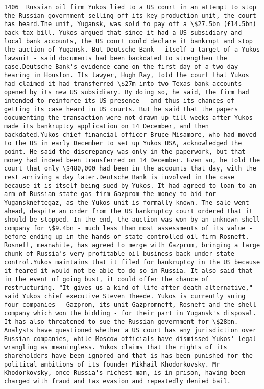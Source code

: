 \documentclass[11pt]{article}
\begin{document}
\begin{Verbatim}[commandchars=\\\{\}]
         1406  Russian oil firm Yukos lied to a US court in an attempt to stop the Russian government selling off its key production unit, the court has heard.The unit, Yugansk, was sold to pay off a \$27.5bn (£14.5bn) back tax bill. Yukos argued that since it had a US subsidiary and local bank accounts, the US court could declare it bankrupt and stop the auction of Yugansk. But Deutsche Bank - itself a target of a Yukos lawsuit - said documents had been backdated to strengthen the case.Deutsche Bank's evidence came on the first day of a two-day hearing in Houston. Its lawyer, Hugh Ray, told the court that Yukos had claimed it had transferred \$27m into two Texas bank accounts opened by its new US subsidiary. By doing so, he said, the firm had intended to reinforce its US presence - and thus its chances of getting its case heard in US courts. But he said that the papers documenting the transaction were not drawn up till weeks after Yukos made its bankruptcy application on 14 December, and then backdated.Yukos chief financial officer Bruce Misamore, who had moved to the US in early December to set up Yukos USA, acknowledged the point. He said the discrepancy was only in the paperwork, but that money had indeed been transferred on 14 December. Even so, he told the court that only \$480,000 had been in the accounts that day, with the rest arriving a day later.Deutsche Bank is involved in the case because it is itself being sued by Yukos. It had agreed to loan to an arm of Russian state gas firm Gazprom the money to bid for Yuganskneftegaz, as the Yukos unit is formally known. The sale went ahead, despite an order from the US bankruptcy court ordered that it should be stopped. In the end, the auction was won by an unknown shell company for \$9.4bn - much less than most assessments of its value - before ending up in the hands of state-controlled oil firm Rosneft. Rosneft, meanwhile, has agreed to merge with Gazprom, bringing a large chunk of Russia's very profitable oil business back under state control.Yukos maintains that it filed for bankruptcy in the US because it feared it would not be able to do so in Russia. It also said that in the event of going bust, it could offer the chance of restructuring. "It gives us a kind of life after death alternative," said Yukos chief executive Steven Theede. Yukos is currently suing four companies - Gazprom, its unit Gazpromneft, Rosneft and the shell company which won the bidding - for their part in Yugansk's disposal. It has also threatened to sue the Russian government for \$28bn. Analysts have questioned whether a US court has any jurisdiction over Russian companies, while Moscow officials have dismissed Yukos' legal wrangling as meaningless. Yukos claims that the rights of its shareholders have been ignored and that is has been punished for the political ambitions of its founder Mikhail Khodorkovsky. Mr Khodorkovsky, once Russia's richest man, is in prison, having been charged with fraud and tax evasion and repeatedly denied bail.                                                                                                                                                                                                                                                                                  
\end{Verbatim}
\end{document}
